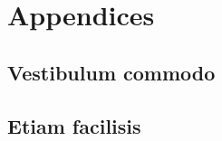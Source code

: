\part{Appendices}
\newpage
\chapter{Vestibulum commodo} \label{ch:commodo}

\newpage
\chapter{Etiam facilisis} \label{ch:etiam}

\newpage
\listoffigures
\listoftables
\newpage
\printbibliography[title = {Aliquam}]


